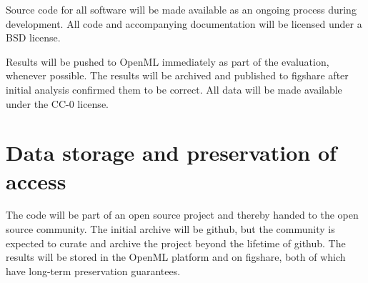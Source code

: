 Source code for all software will be made available as an ongoing process
during development. All code and accompanying documentation will be licensed
under a BSD license.

Results will be pushed to OpenML immediately as part of the evaluation,
whenever possible. The results will be archived and published to figshare after
initial analysis confirmed them to be correct.
All data will be made available under the CC-0 license.

\section{Data storage and preservation of access}

The code will be part of an open source project and thereby handed to the open
source community. The initial archive will be github, but the community is
expected to curate and archive the project beyond the lifetime of github.
The results will be stored in the OpenML platform and on figshare, both of
which have long-term preservation guarantees.

